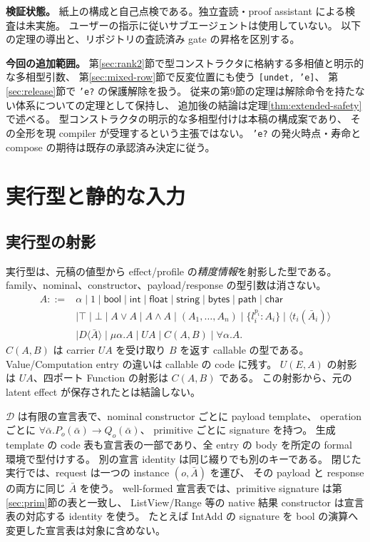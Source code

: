 \documentclass[11pt,a4paper]{article}
\newcommand{\D}{\mathcal D}
\begin{document}
\textbf{検証状態。}
紙上の構成と自己点検である。独立査読・proof assistant による検査は未実施。
ユーザーの指示に従いサブエージェントは使用していない。
以下の定理の導出と、リポジトリの査読済み gate の昇格を区別する。

\textbf{今回の追加範囲。}
第\ref{sec:rank2}節で型コンストラクタに格納する多相値と明示的な多相型引数、
第\ref{sec:mixed-row}節で反変位置にも使う \texttt{[undet, 'e]}、
第\ref{sec:release}節で \texttt{'e?} の保護解除を扱う。
従来の第9節の定理は解除命令を持たない体系についての定理として保持し、
追加後の結論は定理\ref{thm:extended-safety}で述べる。
型コンストラクタの明示的な多相型付けは本稿の構成案であり、
その全形を現 compiler が受理するという主張ではない。
\texttt{'e?} の発火時点・寿命と compose の期待は既存の承認済み決定に従う。

\tableofcontents

\section{実行型と静的な入力}
\label{sec:types}

\subsection{実行型の射影}

実行型は、元稿の値型から effect/profile の\emph{精度情報}を射影した型である。
family、nominal、constructor、payload/response の型引数は消さない。
\[
\begin{split}
 A::={}&\alpha\mid 1\mid\mathsf{bool}\mid\mathsf{int}\mid\mathsf{float}
 \mid\mathsf{string}\mid\mathsf{bytes}\mid\mathsf{path}\mid\mathsf{char}\\
 &\mid\top\mid\bot\mid A\vee A\mid A\wedge A
 \mid(A_1,\ldots,A_n)\mid\{l_i^{p_i}:A_i\}
 \mid\langle t_i(\bar A_i)\rangle\\
 &\mid D\langle\bar A\rangle\mid\mu\alpha.A\mid U A
 \mid C(A,B)\mid\forall\alpha.A.
\end{split}
\]
\(C(A,B)\) は carrier \(UA\) を受け取り \(B\) を返す callable の型である。
Value/Computation entry の違いは callable の code に残す。
\(U(E,A)\) の射影は \(UA\)、四ポート Function の射影は \(C(A,B)\) である。
この射影から、元の latent effect が保存されたとは結論しない。

\(\D\) は有限の宣言表で、nominal constructor ごとに payload template、
operation ごとに \(\forall\bar\alpha.P_o(\bar\alpha)\to Q_o(\bar\alpha)\)、
primitive ごとに signature を持つ。
生成 template の code 表も宣言表の一部であり、全 entry の body を所定の formal 環境で型付けする。
別の宣言 identity は同じ綴りでも別のキーである。
閉じた実行では、request は一つの instance \((o,\bar A)\) を運び、
その payload と response の両方に同じ \(\bar A\) を使う。
well-formed 宣言表では、primitive signature は第\ref{sec:prim}節の表と一致し、
ListView/Range 等の native 結果 constructor は宣言表の対応する identity を使う。
たとえば IntAdd の signature を bool の演算へ変更した宣言表は対象に含めない。
\end{document}
